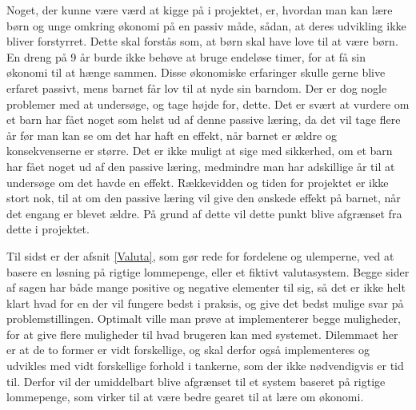 Noget, der kunne være værd at kigge på i projektet, er, hvordan man kan lære børn og unge omkring økonomi på en passiv måde, sådan, at deres udvikling ikke bliver forstyrret. Dette skal forstås som, at børn skal have love til at være børn. En dreng på 9 år burde ikke behøve at bruge endeløse timer, for at få sin økonomi til at hænge sammen. Disse økonomiske erfaringer skulle gerne blive erfaret passivt, mens barnet får lov til at nyde sin barndom. Der er dog nogle problemer med at undersøge, og tage højde for, dette. Det er svært at vurdere om et barn har fået noget som helst ud af denne passive læring, da det vil tage flere år før man kan se om det har haft en effekt, når barnet er ældre og konsekvenserne er større. Det er ikke muligt at sige med sikkerhed, om et barn har fået noget ud af den passive læring, medmindre man har adskillige år til at undersøge om det havde en effekt. Rækkevidden og tiden for projektet er ikke stort nok, til at om den passive læring vil give den ønskede effekt på barnet, når det engang er blevet ældre. På grund af dette vil dette punkt blive afgrænset fra dette i projektet.

Til sidst er der afsnit \ref{Valuta}, som gør rede for fordelene og ulemperne, ved at basere en løsning på rigtige lommepenge, eller et fiktivt valutasystem. Begge sider af sagen har både mange positive og negative elementer til sig, så det er ikke helt klart hvad for en der vil fungere bedst i praksis, og give det bedst mulige svar på problemstillingen. Optimalt ville man prøve at implementerer begge muligheder, for at give flere muligheder til hvad brugeren kan med systemet. Dilemmaet her er at de to former er vidt forskellige, og skal derfor også implementeres og udvikles med vidt forskellige forhold i tankerne, som der ikke nødvendigvis er tid til. Derfor vil der umiddelbart blive afgrænset til et system baseret på rigtige lommepenge, som virker til at være bedre gearet til at lære om økonomi.

